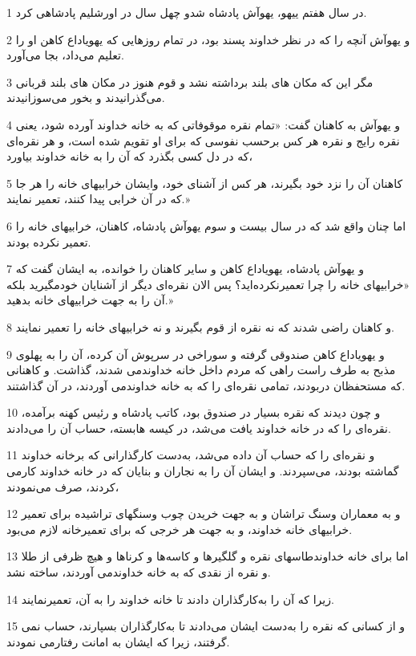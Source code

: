 \par 1 در سال هفتم ییهو، یهوآش پادشاه شدو چهل سال در اورشلیم پادشاهی کرد.
\par 2 و یهوآش آنچه را که در نظر خداوند پسند بود، در تمام روزهایی که یهویاداع کاهن او را تعلیم می‌داد، بجا می‌آورد.
\par 3 مگر این که مکان های بلند برداشته نشد و قوم هنوز در مکان های بلند قربانی می‌گذرانیدند و بخور می‌سوزانیدند.
\par 4 و یهوآش به کاهنان گفت: «تمام نقره موقوفاتی که به خانه خداوند آورده شود، یعنی نقره رایج و نقره هر کس بر‌حسب نفوسی که برای او تقویم شده است، و هر نقره‌ای که در دل کسی بگذرد که آن را به خانه خداوند بیاورد،
\par 5 کاهنان آن را نزد خود بگیرند، هر کس از آشنای خود، وایشان خرابیهای خانه را هر جا که در آن خرابی پیدا کنند، تعمیر نمایند.»
\par 6 اما چنان واقع شد که در سال بیست و سوم یهوآش پادشاه، کاهنان، خرابیهای خانه را تعمیر نکرده بودند.
\par 7 و یهوآش پادشاه، یهویاداع کاهن و سایر کاهنان را خوانده، به ایشان گفت که «خرابیهای خانه را چرا تعمیرنکرده‌اید؟ پس الان نقره‌ای دیگر از آشنایان خودمگیرید بلکه آن را به جهت خرابیهای خانه بدهید.»
\par 8 و کاهنان راضی شدند که نه نقره از قوم بگیرند و نه خرابیهای خانه را تعمیر نمایند.
\par 9 و یهویاداع کاهن صندوقی گرفته و سوراخی در سرپوش آن کرده، آن را به پهلوی مذبح به طرف راست راهی که مردم داخل خانه خداوندمی شدند، گذاشت. و کاهنانی که مستحفظان دربودند، تمامی نقره‌ای را که به خانه خداوندمی آوردند، در آن گذاشتند.
\par 10 و چون دیدند که نقره بسیار در صندوق بود، کاتب پادشاه و رئیس کهنه برآمده، نقره‌ای را که در خانه خداوند یافت می‌شد، در کیسه هابسته، حساب آن را می‌دادند.
\par 11 و نقره‌ای را که حساب آن داده می‌شد، به‌دست کارگذارانی که برخانه خداوند گماشته بودند، می‌سپردند. و ایشان آن را به نجاران و بنایان که در خانه خداوند کارمی کردند، صرف می‌نمودند،
\par 12 و به معماران وسنگ تراشان و به جهت خریدن چوب وسنگهای تراشیده برای تعمیر خرابیهای خانه خداوند، و به جهت هر خرجی که برای تعمیرخانه لازم می‌بود.
\par 13 اما برای خانه خداوندطاسهای نقره و گلگیرها و کاسه‌ها و کرناها و هیچ ظرفی از طلا و نقره از نقدی که به خانه خداوندمی آوردند، ساخته نشد.
\par 14 زیرا که آن را به‌کارگذاران دادند تا خانه خداوند را به آن، تعمیرنمایند.
\par 15 و از کسانی که نقره را به‌دست ایشان می‌دادند تا به‌کارگذاران بسپارند، حساب نمی گرفتند، زیرا که ایشان به امانت رفتارمی نمودند.
